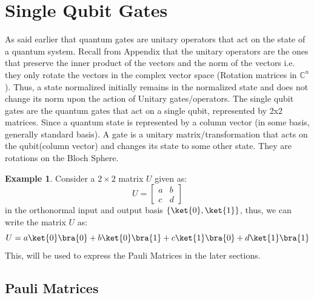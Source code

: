 \documentclass[12pt, oneside]{book}
\theoremstyle{definition}
\theoremstyle{definition}
\newtheorem{example}{Example}[section]
\theoremstyle{remark}
\begin{document}
\section{Single Qubit Gates}
As said earlier that quantum gates are unitary operators that act on the state of a quantum system. 
Recall from Appendix that the unitary operators are the ones that preserve the inner product of the vectors and the norm of the vectors i.e. they 
only rotate the vectors in the complex vector space (Rotation matrices in $\mathbb{C}^n$). Thus, a state normalized initially remains in the normalized state and does not change its norm 
upon the action of Unitary gates/operators.
The single qubit gates are the quantum gates that act on a single qubit, represented by 2x2 matrices. Since a quantum state is represented by a column vector (in some basis, generally standard basis). 
A gate is a unitary matrix/transformation 
that acts on the qubit(column vector) and changes its state to some other state.
They are rotations on the Bloch Sphere.
\begin{example}
    Consider a $2 \times 2$ matrix $U$ given as:
    \[
        U=\begin{bmatrix}
            a & b \\
            c & d
        \end{bmatrix}
    \]
    in the orthonormal input and output basis $\{\ket{0},\ket{1}\}$, thus, we can write the matrix $U$ as:
    \[
        U=a\ket{0}\bra{0}+b\ket{0}\bra{1}+c\ket{1}\bra{0}+d\ket{1}\bra{1}
    \]
    This, will be used to express the Pauli Matrices in the later sections.
\end{example}

\subsection{Pauli Matrices}
\end{document}
